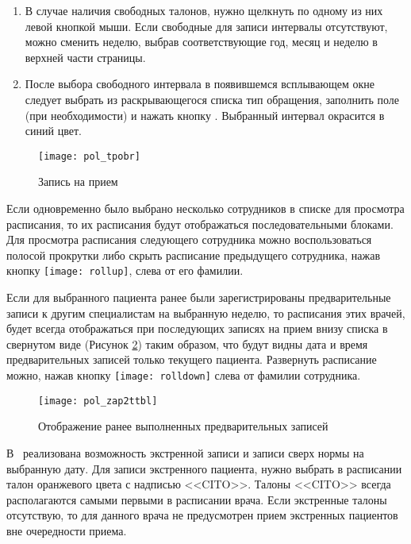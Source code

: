 \begin{enumerate}
 \item В случае наличия свободных талонов, нужно щелкнуть по одному из них левой кнопкой мыши. Если свободные для записи интервалы отсутствуют, можно сменить неделю, выбрав соответствующие год, месяц и неделю в верхней части страницы.
 \item После выбора свободного интервала в появившемся всплывающем окне следует выбрать из раскрывающегося списка тип обращения, заполнить поле  (при необходимости) и нажать кнопку . Выбранный интервал окрасится в синий цвет.
\end{enumerate}

 \begin{figure}[ht]\centering
  \texttt{[image: pol\_tpobr]}
  \caption{Запись на прием}
  \label{img_pol_tpobr}
 \end{figure}

Если одновременно было выбрано несколько сотрудников в списке для просмотра расписания, то их расписания будут отображаться последовательными блоками. Для просмотра расписания следующего сотрудника можно воспользоваться полосой прокрутки либо скрыть расписание предыдущего сотрудника, нажав кнопку \texttt{[image: rollup]}, слева от его фамилии.

Если для выбранного пациента ранее были зарегистрированы предварительные записи к другим специалистам на выбранную неделю, то расписания этих врачей, будет всегда отображаться при последующих записях на прием внизу списка в свернутом виде (Рисунок \ref{img_pol_zap2ttbl}) таким образом, что будут видны дата и время предварительных записей только текущего пациента. Развернуть расписание можно, нажав кнопку \texttt{[image: rolldown]} слева от фамилии сотрудника.

 \begin{figure}[ht]\centering
  \texttt{[image: pol\_zap2ttbl]}
  \caption{Отображение ранее выполненных предварительных записей}
  \label{img_pol_zap2ttbl}
 \end{figure}
     
В \tmisp~реализована возможность экстренной записи и записи сверх нормы на выбранную дату. Для записи экстренного пациента, нужно выбрать в расписании талон оранжевого цвета с надписью <<CITO>>. Талоны <<CITO>> всегда располагаются самыми первыми в расписании врача. Если экстренные талоны отсутствую, то для данного врача не предусмотрен прием экстренных пациентов вне очередности приема.

